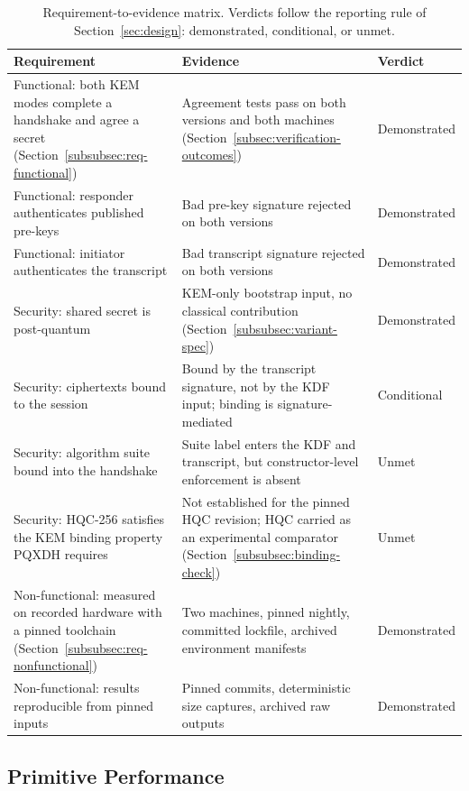 \begin{table}[htbp]
\centering
\caption{Requirement-to-evidence matrix. Verdicts follow the reporting rule of Section~\ref{sec:design}: demonstrated, conditional, or unmet.}
\label{tab:req-evidence}
\small
\begin{tabular}{p{} p{} p{}}
\hline
\textbf{Requirement} & \textbf{Evidence} & \textbf{Verdict} \\
\hline
Functional: both KEM modes complete a handshake and agree a secret (Section~\ref{subsubsec:req-functional}) & Agreement tests pass on both versions and both machines (Section~\ref{subsec:verification-outcomes}) & Demonstrated \\
Functional: responder authenticates published pre-keys & Bad pre-key signature rejected on both versions & Demonstrated \\
Functional: initiator authenticates the transcript & Bad transcript signature rejected on both versions & Demonstrated \\
Security: shared secret is post-quantum & KEM-only bootstrap input, no classical contribution (Section~\ref{subsubsec:variant-spec}) & Demonstrated \\
Security: ciphertexts bound to the session & Bound by the transcript signature, not by the KDF input; binding is signature-mediated & Conditional \\
Security: algorithm suite bound into the handshake & Suite label enters the KDF and transcript, but constructor-level enforcement is absent & Unmet \\
Security: HQC-256 satisfies the KEM binding property PQXDH requires & Not established for the pinned HQC revision; HQC carried as an experimental comparator (Section~\ref{subsubsec:binding-check}) & Unmet \\
Non-functional: measured on recorded hardware with a pinned toolchain (Section~\ref{subsubsec:req-nonfunctional}) & Two machines, pinned nightly, committed lockfile, archived environment manifests & Demonstrated \\
Non-functional: results reproducible from pinned inputs & Pinned commits, deterministic size captures, archived raw outputs & Demonstrated \\
\hline
\end{tabular}
\end{table}

\subsection{Primitive Performance}
\label{subsec:primitive-results}

